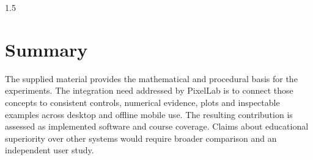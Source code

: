 \begin{spacing}{1.5}
\section{Summary}
The supplied material provides the mathematical and procedural basis for the experiments. The integration need addressed by PixelLab is to connect those concepts to consistent controls, numerical evidence, plots and inspectable examples across desktop and offline mobile use. The resulting contribution is assessed as implemented software and course coverage. Claims about educational superiority over other systems would require broader comparison and an independent user study.

\end{spacing}